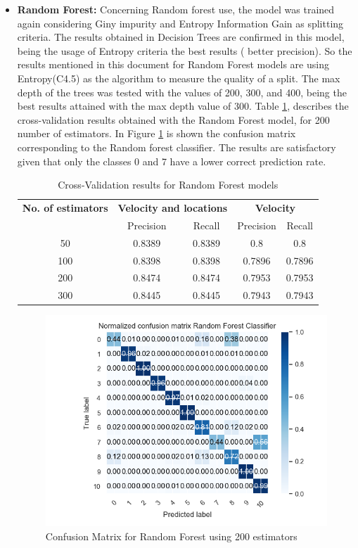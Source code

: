 \begin{itemize}
\newpage
\item \textbf{ Random Forest: }
Concerning Random forest use, the model was trained again considering Giny impurity and Entropy Information Gain as splitting criteria. 
The results obtained in Decision Trees are confirmed in this model, being the usage of Entropy criteria the best results ( better precision). 
So the results mentioned in this document for Random Forest models are using Entropy(C4.5) as the algorithm to measure the quality of a split. The max depth of the trees was tested with the values of 200, 300, and 400, being the best results attained with the max depth value of 300. Table \ref{table:cross_val_rf}, describes the cross-validation results obtained with the Random Forest model, for 200 number of estimators. 
In Figure \ref{table:cross_val_rf} is shown the confusion matrix corresponding to the Random forest classifier. The results are satisfactory given that only the classes 0 and 7 have a lower correct prediction rate.

\begin {table}[H]
\caption {Cross-Validation results for Random Forest models}
\begin{center}
\begin{tabular}{c|c|c|c|c}
\multicolumn{1}{c|}{\textbf{No. of estimators } } &\multicolumn{2}{c|}{\textbf{ Velocity and locations}}& \multicolumn{2}{c}{\textbf{ Velocity}}\\
&Precision & Recall & Precision & Recall \\
\hline
50 &0.8389&0.8389 &0.8 &0.8\\
100 &0.8398&0.8398 &0.7896 &0.7896\\
200 &0.8474&0.8474 &0.7953 &0.7953 \\
300 &0.8445&0.8445 &0.7943 &0.7943 
\label{table:cross_val_rf}
\end{tabular}
\end{center}
\end {table}


\begin{figure}[h]
\centering
\includegraphics[width=0.8\linewidth]{Chapters/img/CM_RF.png}
\caption{Confusion Matrix for Random Forest using 200 estimators}
\label{fig:cm_rf}
\end{figure}



\end{itemize}
